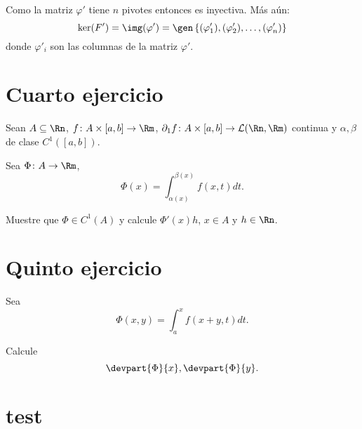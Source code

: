 \documentclass{scrartcl}
\begin{document}
Como la matriz \(\varphi'\) tiene \(n\) pivotes entonces
es inyectiva. Más aún:
\[
\ker(F') = \img(\varphi') = 
    \gen \left\{
        (\varphi'_1), (\varphi'_2),\dots, (\varphi'_n)
    \right\}
\]
donde \(\varphi'_i\) son las columnas de la matriz \(\varphi'\).

\section{Cuarto ejercicio}

Sean \(A\subseteq\Rn\), \(f\colon A\times[a,b]\to\Rm\),
\(\partial_1 f\colon A\times[a,b]\to\mathcal{L}(\Rn,\Rm)\) continua
y \(\alpha,\beta\) de clase \(C^1([a,b])\).

Sea \(\Phi\colon A\to\Rm\),
\[\Phi(x) = \int_{\alpha(x)}^{\beta(x)} f(x,t) dt.\]

Muestre que \(\Phi\in C^1(A)\) 
y calcule \(\Phi'(x)h\), \(x\in A\) y \(h\in\Rn\).

\section{Quinto ejercicio}

Sea
\[\Phi(x,y) = \int_a^x f(x+y,t) dt.\]

Calcule
\[\devpart{\Phi}{x}, \devpart{\Phi}{y}.\]

\section{test}


\end{document}
